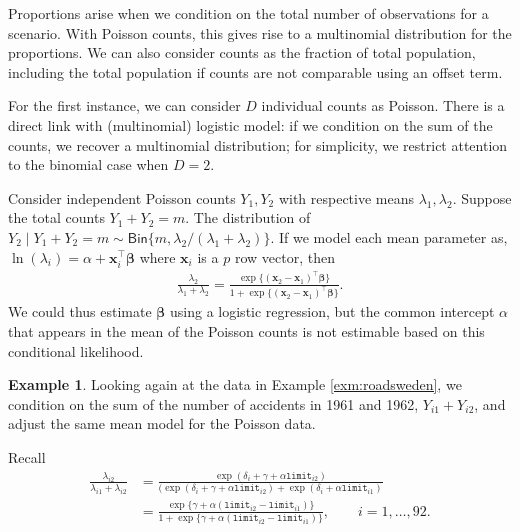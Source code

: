 \documentclass[
  11pt,
  letterpaper,
]{book}
\theoremstyle{definition}
\theoremstyle{definition}
\newtheorem{example}{Example}[chapter]
\theoremstyle{definition}
\theoremstyle{remark}
\begin{document}
Proportions arise when we condition on the total number of observations for a scenario. With Poisson counts, this gives rise to a multinomial distribution for the proportions. We can also consider counts as the fraction of total population, including the total population if counts are not comparable using an offset term.

For the first instance, we can consider \(D\) individual counts as Poisson. There is a direct link with (multinomial) logistic model: if we condition on the sum of the counts, we recover a multinomial distribution; for simplicity, we restrict attention to the binomial case when \(D=2\).

Consider independent Poisson counts \(Y_1, Y_2\) with respective means \(\lambda_1, \lambda_2\). Suppose the total counts \(Y_1 + Y_2 = m\).
The distribution of \(Y_2 \mid Y_1 + Y_2=m \sim \mathsf{Bin}\{m, \lambda_2/(\lambda_1 + \lambda_2)\}\).
If we model each mean parameter as, \(\ln(\lambda_i) = \alpha + \mathbf{x}_i^\top\boldsymbol{\beta}\) where \(\mathbf{x}_i\) is a \(p\) row vector, then
\begin{align*}
\frac{\lambda_2}{\lambda_1 + \lambda_2} = \frac{\exp\{(\mathbf{x}_2-\mathbf{x}_1)^\top\boldsymbol{\beta}\}}{1+\exp\{(\mathbf{x}_2-\mathbf{x}_1)^\top\boldsymbol{\beta}\}}.
\end{align*}
We could thus estimate \(\boldsymbol{\beta}\) using a logistic regression, but the common intercept \(\alpha\) that appears in the mean of the Poisson counts is not estimable based on this conditional likelihood.

\begin{example}
\protect\hypertarget{exm:swedenex2}{}{\label{exm:swedenex2} }
Looking again at the data in Example \ref{exm:roadsweden}, we condition on the sum of the number of accidents in 1961 and 1962, \(Y_{i1} + Y_{i2}\), and adjust the same mean model for the Poisson data.
\end{example}
Recall
\begin{align*}
\frac{\lambda_{i2}}{
\lambda_{i1} + \lambda_{i2}} &= \frac{\exp(\delta_i + \gamma + \alpha \texttt{limit}_{i2})}{(\exp(\delta_i + \gamma + \alpha \texttt{limit}_{i2}) + \exp(\delta_i + \alpha \texttt{limit}_{i1})} \\&= \frac{\exp\{\gamma + \alpha(\texttt{limit}_{i2}-\texttt{limit}_{i1})\}}{1+{\exp\{\gamma + \alpha(\texttt{limit}_{i2}-\texttt{limit}_{i1})\}}}, \qquad i=1, \ldots, 92. 
\end{align*}
\end{document}
